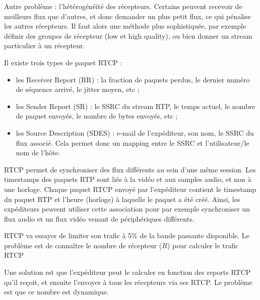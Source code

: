 		Autre problème : l'hétérogénéité des récepteurs. Certains peuvent recevoir de meilleurs flux que d'autres, et donc demander un plus petit flux, ce qui pénalise les autres récepteurs. Il faut alors une méthode plus sophistiquée, par exemple définir des groupes de récepteur (low et high quality), ou bien donner un stream particulier à un récepteur.
		
		
		Il existe trois types de paquet RTCP :
		
		\begin{itemize}
			\item les Receiver Report (RR) : la fraction de paquets perdus, le dernier numéro de séquence arrivé, le jitter moyen, etc ;
			\item les Sender Report (SR) : le SSRC du stream RTP, le temps actuel, le nombre de paquet envoyés, le nombre de bytes envoyés, etc ;
			\item les Source Description (SDES) : e-mail de l'expéditeur, son nom, le SSRC du flux associé. Cela permet donc un mapping entre le SSRC et l'utilisateur/le nom de l'hôte.
		\end{itemize}
		
		RTCP permet de synchroniser des flux différents au sein d'une même session. Les timestamps des paquets RTP sont liés à la vidéo et aux samples audio, et non à une horloge. Chaque paquet RTCP envoyé par l'expéditeur contient le timestamp du paquet RTP et l'heure (horloge) à laquelle le paquet a été créé. Ainsi, les expéditeurs peuvent utiliser cette association pour par exemple synchroniser un flux audio et un flux vidéo venant de périphériques différents.
		
		
		RTCP va essayer de limiter son trafic à 5\% de la bande passante disponible. Le problème est de connaître le nombre de récepteur ($R$) pour calculer le trafic RTCP
		
		 Une solution est que l'expéditeur peut le calculer en fonction des reports RTCP qu'il reçoit, et ensuite l'envoyer à tous les récepteurs via ses RTCP. Le problème est que ce nombre est dynamique.
		 
